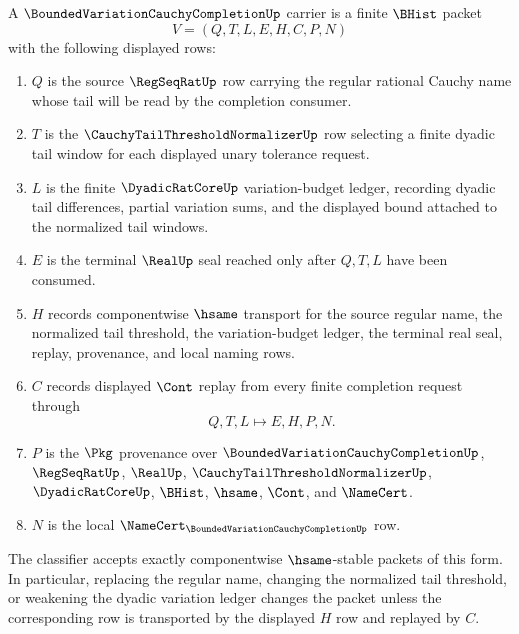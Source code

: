 \begin{definition}
\label{def:bounded-variation-cauchy-completion-carrier}
A $\BoundedVariationCauchyCompletionUp$ carrier is a finite $\BHist$ packet
$$
V=(Q,T,L,E,H,C,P,N)
$$
with the following displayed rows:
\begin{enumerate}
\item $Q$ is the source $\RegSeqRatUp$ row carrying the regular rational Cauchy name whose tail will be read by the completion consumer.
\item $T$ is the $\CauchyTailThresholdNormalizerUp$ row selecting a finite dyadic tail window for each displayed unary tolerance request.
\item $L$ is the finite $\DyadicRatCoreUp$ variation-budget ledger, recording dyadic tail differences, partial variation sums, and the displayed bound attached to the normalized tail windows.
\item $E$ is the terminal $\RealUp$ seal reached only after $Q,T,L$ have been consumed.
\item $H$ records componentwise $\hsame$ transport for the source regular name, the normalized tail threshold, the variation-budget ledger, the terminal real seal, replay, provenance, and local naming rows.
\item $C$ records displayed $\Cont$ replay from every finite completion request through
$$
Q,T,L \longmapsto E,H,P,N .
$$
\item $P$ is the $\Pkg$ provenance over $\BoundedVariationCauchyCompletionUp$, $\RegSeqRatUp$, $\RealUp$, $\CauchyTailThresholdNormalizerUp$, $\DyadicRatCoreUp$, $\BHist$, $\hsame$, $\Cont$, and $\NameCert$.
\item $N$ is the local $\NameCert_{\BoundedVariationCauchyCompletionUp}$ row.
\end{enumerate}
The classifier accepts exactly componentwise $\hsame$-stable packets of this form. In particular, replacing the regular name, changing the normalized tail threshold, or weakening the dyadic variation ledger changes the packet unless the corresponding row is transported by the displayed $H$ row and replayed by $C$.
\end{definition}

